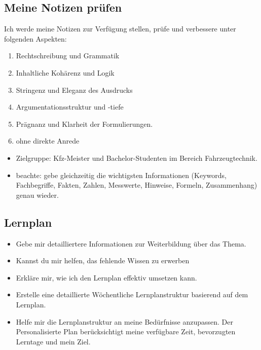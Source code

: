 \documentclass{vorlage-design-main}
\begin{document}
\subsection{Meine Notizen prüfen}\label{meine-notizen-pruefen}

Ich werde meine Notizen zur Verfügung stellen, prüfe und verbessere
unter folgenden Aspekten:

\begin{enumerate}
\def\labelenumi{\arabic{enumi}.}

\item
  Rechtschreibung und Grammatik
\item
  Inhaltliche Kohärenz und Logik
\item
  Stringenz und Eleganz des Ausdrucks
\item
  Argumentationsstruktur und -tiefe
\item
  Prägnanz und Klarheit der Formulierungen.
\item
  ohne direkte Anrede
\end{enumerate}

\begin{itemize}

\item
  Zielgruppe: Kfz-Meister und Bachelor-Studenten im Bereich
  Fahrzeugtechnik.
\item
  beachte: gebe gleichzeitig die wichtigsten Informationen (Keywords,
  Fachbegriffe, Fakten, Zahlen, Messwerte, Hinweise, Formeln,
  Zusammenhang) genau wieder.
\end{itemize}

\subsection{Lernplan}\label{lernplan}

\begin{itemize}

\item
  Gebe mir detailliertere Informationen zur Weiterbildung über das
  Thema.
\item
  Kannst du mir helfen, das fehlende Wissen zu erwerben
\item
  Erkläre mir, wie ich den Lernplan effektiv umsetzen kann.
\item
  Erstelle eine detaillierte Wöchentliche Lernplanstruktur basierend auf
  dem Lernplan.
\item
  Helfe mir die Lernplanstruktur an meine Bedürfnisse anzupassen. Der
  Personalisierte Plan berücksichtigt meine verfügbare Zeit, bevorzugten
  Lerntage und mein Ziel.
\end{itemize}
\end{document}
